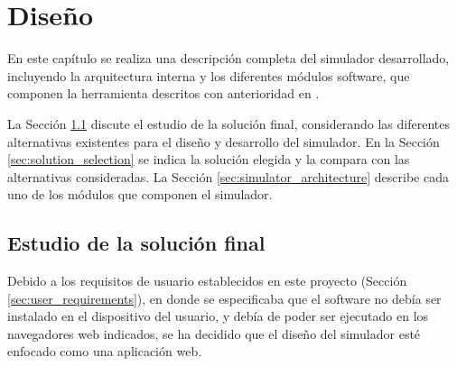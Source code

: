 \chead[]{}
\renewcommand{\headrulewidth}{0.5pt}

\lfoot[]{}
\cfoot[]{}
\rfoot[]{}
\renewcommand{\footrulewidth}{0pt}

\chapter{Diseño}
\label{ch:design}

En este capítulo se realiza una descripción completa del simulador desarrollado, incluyendo la arquitectura interna y los diferentes módulos \gls{software}, que componen la herramienta descritos con anterioridad en \cite{mateos2016wepsim}.

La Sección \ref{sec:study_of_solution} discute el estudio de la solución final, considerando las diferentes alternativas existentes para el diseño y desarrollo del simulador. En la Sección \ref{sec:solution_selection} se indica la solución elegida y la compara con las alternativas consideradas. La Sección \ref{sec:simulator_architecture} describe cada uno de los módulos que componen el simulador.

\section{Estudio de la solución final}
\label{sec:study_of_solution}

Debido a los requisitos de usuario establecidos en este proyecto (Sección \ref{sec:user_requirements}), en donde se especificaba que el \gls{software} no debía ser instalado en el dispositivo del usuario, y debía de poder ser ejecutado en los navegadores web indicados, se ha decidido que el diseño del simulador esté enfocado como una aplicación web.

